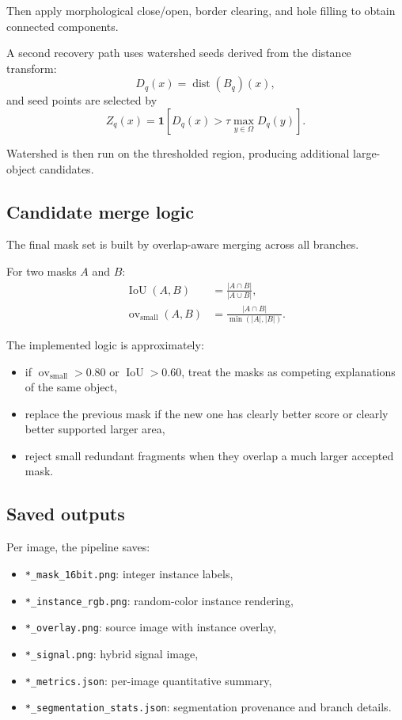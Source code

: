 \documentclass[11pt]{article}
\newcommand{\1}{\mathbf{1}}
\newcommand{\IoU}{\operatorname{IoU}}
\newcommand{\ovsmall}{\operatorname{ov}_{\mathrm{small}}}
\newcommand{\dist}{\operatorname{dist}}
\begin{document}
Then apply morphological close/open, border clearing, and hole filling to obtain connected components.

A second recovery path uses watershed seeds derived from the distance transform:
\begin{equation}
D_q(x) = \dist(B_q)(x),
\end{equation}
and seed points are selected by
\begin{equation}
Z_q(x) = \1\left[D_q(x) > \tau \max_{y\in\Omega} D_q(y)\right].
\end{equation}

Watershed is then run on the thresholded region, producing additional large-object candidates.

\subsection{Candidate merge logic}
The final mask set is built by overlap-aware merging across all branches.

For two masks $A$ and $B$:
\begin{align}
\IoU(A,B) &= \frac{|A\cap B|}{|A\cup B|},\\
\ovsmall(A,B) &= \frac{|A\cap B|}{\min(|A|,|B|)}.
\end{align}

The implemented logic is approximately:
\begin{itemize}[leftmargin=1.5em]
  \item if $\ovsmall>0.80$ or $\IoU>0.60$, treat the masks as competing explanations of the same object,
  \item replace the previous mask if the new one has clearly better score or clearly better supported larger area,
  \item reject small redundant fragments when they overlap a much larger accepted mask.
\end{itemize}

\subsection{Saved outputs}
Per image, the pipeline saves:
\begin{itemize}[leftmargin=1.5em]
  \item \texttt{*\_mask\_16bit.png}: integer instance labels,
  \item \texttt{*\_instance\_rgb.png}: random-color instance rendering,
  \item \texttt{*\_overlay.png}: source image with instance overlay,
  \item \texttt{*\_signal.png}: hybrid signal image,
  \item \texttt{*\_metrics.json}: per-image quantitative summary,
  \item \texttt{*\_segmentation\_stats.json}: segmentation provenance and branch details.
\end{itemize}
\end{document}
